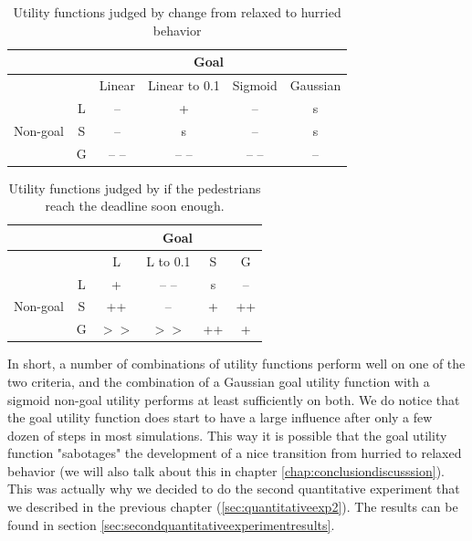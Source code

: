 \documentclass[11pt]{book}
\begin{document}
\begin{table}[h!]
\centering
\begin{tabular}{|c|c|c|c|c|c|}
\hline
 & \multicolumn{5}{c|}{Goal}\\
 \hline
 & & Linear & Linear to 0.1 & Sigmoid & Gaussian\\
 \hline
 \multirow{3}{*}{Non-goal} & L & -- & + & -- & s\\
 & S & -- & s & -- & s\\
 & G & -- -- & -- -- & -- -- & --\\
 \hline
\end{tabular}
\caption{Utility functions judged by change from relaxed to hurried behavior}
\label{tab:judgegoalhurry}
\end{table}

\begin{table}[h!]
\centering
\begin{tabular}{|c|c|c|c|c|c|}
\hline
 &  & \multicolumn{4}{c|}{Goal} \\ 
\hline 
 &  & L & L to 0.1 & S & G \\ 
\hline 
\multirow{3}{*}{Non-goal} & L & + & -- -- & s & -- \\ 
 & S & ++ & -- & + & ++ \\ 
 & G & $>>$ & $>>$ & ++ & + \\ 
\hline 
\end{tabular} 
\caption{Utility functions judged by if the pedestrians reach the deadline soon enough.}
\label{tab:judgegoaldeadline}
\end{table}

%


In short, a number of combinations of utility functions perform well on one of the two criteria, and the combination of a Gaussian goal utility function with a sigmoid non-goal utility performs at least sufficiently on both. We do notice that the goal utility function does start to have a large influence after only a few dozen of steps in most simulations. This way it is possible that the goal utility function "sabotages" the development of a nice transition from hurried to relaxed behavior (we will also talk about this in chapter \ref{chap:conclusiondiscusssion}). This was actually why we decided to do the second quantitative experiment that we described in the previous chapter (\ref{sec:quantitativeexp2}). The results can be found in section \ref{sec:secondquantitativeexperimentresults}.
\end{document}
